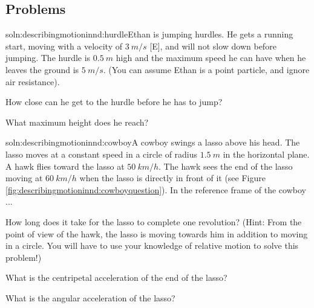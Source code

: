 \subsection{Problems}
\begin{problemParts}{soln:describingmotioninnd:hurdle}{\label{prob:describingmotioninnd:hurdle}Ethan is jumping hurdles. He gets a running start, moving with a velocity of $\SI{3}{m/s}$ [E], and will not slow down before jumping. The hurdle is $\SI{0.5}{m}$ high and the maximum speed he can have when he leaves the ground is $\SI{5}{m/s}$. (You can assume Ethan is a point particle, and ignore air resistance).}
\item How close can he get to the hurdle before he has to jump?
\item What maximum height does he reach?
\end{problemParts}

\begin{problemParts}{soln:describingmotioninnd:cowboy}{\label{prob:describingmotioninnd:cowboy}A cowboy swings a lasso above his head. The lasso moves at a constant speed in a circle of radius $\SI{1.5}{m}$ in the horizontal plane. A hawk flies toward the lasso at $\SI{50}{km/h}$. The hawk sees the end of the lasso moving at $\SI{60}{km/h}$ when the lasso is directly in front of it (see Figure \ref{fig:describingmotioninnd:cowboyquestion}). In the reference frame of the cowboy ...}
\item How long does it take for the lasso to complete one revolution? (Hint: From the point of view of the hawk, the lasso is moving towards him in addition to moving in a circle. You will have to use your knowledge of relative motion to solve this problem!)
\item What is the centripetal acceleration of the end of the lasso? 
\item What is the angular acceleration of the lasso?
\end{problemParts} 

\newpage
